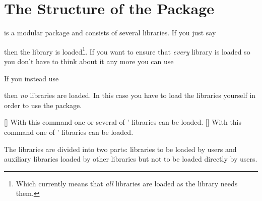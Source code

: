 \documentclass[load-preamble+]{cnltx-doc}
\def\library*#1{``#1''}%
\begin{document}
\section{The Structure of the Package}
\leadsheets{} is a modular package and consists of several libraries.  If you
just say
\begin{sourcecode}
  \usepackage{leadsheets}
\end{sourcecode}
then the  library is loaded\footnote{Which currently means that
  \emph{all} libraries are loaded as the  library needs them.}.
If you want to ensure that \emph{every} library is loaded
so you don't have to think about it any more you can use
\begin{sourcecode}
  \usepackage[full]{leadsheets}
\end{sourcecode}
If you instead use
\begin{sourcecode}
  \usepackage[minimal]{leadsheets}
\end{sourcecode}
then \emph{no} libraries are loaded.  In this case you have to load the
libraries yourself in order to use the package.
\begin{commands}
  []
    With this command one or several of \leadsheets' libraries can be loaded.
  []
    With this command one of \leadsheets' libraries can be loaded.
\end{commands}
The libraries are divided into two parts: libraries to be loaded by users and
auxiliary libraries loaded by other libraries but not to be loaded directly by
users.
\end{document}
